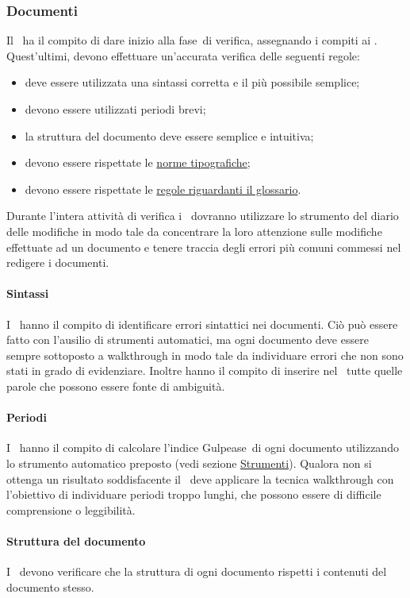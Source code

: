 \documentclass[../NormeProgetto.tex]{subfiles}
\begin{document}
	\subsubsection{Documenti}
		Il \responsabilediprogetto\ ha il compito di dare inizio alla fase\g\ di verifica, assegnando i compiti ai \verificatori. Quest'ultimi, devono effettuare un'accurata verifica delle seguenti regole:
		\begin{itemize}
			\item deve essere utilizzata una sintassi corretta e il più possibile semplice;
			\item devono essere utilizzati periodi brevi;
			\item la struttura del documento deve essere semplice e intuitiva;
			\item devono essere rispettate le  \hyperref[sec:Norme tipografiche]{norme tipografiche};
			\item devono essere rispettate le \hyperref[sec:Glossario]{regole riguardanti il glossario}.
		\end{itemize}
		Durante l'intera attività di verifica i \verificatori\ dovranno utilizzare lo strumento del diario delle modifiche in modo tale da concentrare la loro attenzione sulle modifiche effettuate ad un documento e tenere traccia degli errori più comuni commessi nel redigere i documenti.
		\paragraph{Sintassi}
			I \verificatori\ hanno il compito di identificare errori sintattici nei documenti. Ciò può essere fatto con l'ausilio di strumenti automatici, ma ogni documento deve essere sempre sottoposto a walkthrough in modo tale da individuare errori che non sono stati in grado di evidenziare. Inoltre hanno il compito di inserire nel \glossario\ tutte quelle parole che possono essere fonte di ambiguità.
		\paragraph{Periodi}
			I \verificatori\ hanno il compito di calcolare l'indice Gulpease\g\ di ogni documento utilizzando lo strumento automatico preposto (vedi sezione \hyperref[sec:Strumenti]{Strumenti}). Qualora non si ottenga un risultato soddisfacente il \verificatore\ deve applicare la tecnica walkthrough con l'obiettivo di individuare periodi troppo lunghi, che possono essere di difficile comprensione o leggibilità.
		\paragraph{Struttura del documento}
			I \verificatori\ devono verificare che la struttura di ogni documento rispetti i contenuti del documento stesso.
\end{document}
